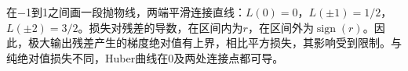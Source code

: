 在\ensuremath{-}1到1之间画一段抛物线，两端平滑连接直线：\(L(0)=0\)，\(L(\pm1)=1/2\)，\(L(\pm2)=3/2\)。损失对残差的导数，在区间内为\(r\)，在区间外为\(\operatorname{sign}(r)\)。因此，极大输出残差产生的梯度绝对值有上界，相比平方损失，其影响受到限制。与纯绝对值损失不同，Huber曲线在0及两处连接点都可导。
